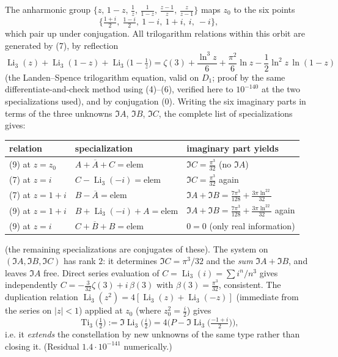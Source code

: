 \documentclass[11pt]{article}
\theoremstyle{remark}
\begin{document}
The anharmonic group $\{z,\,1-z,\,\tfrac1z,\,\tfrac1{1-z},\,\tfrac{z-1}z,\,\tfrac z{z-1}\}$ maps $z_0$ to the six points
\[
\Big\{\tfrac{1+i}2,\ \tfrac{1-i}2,\ 1-i,\ 1+i,\ i,\ -i\Big\},
\]
which pair up under conjugation. All trilogarithm relations within this orbit are generated by (7), by reflection
\begin{equation*}
\operatorname{Li}_3(z)+\operatorname{Li}_3(1-z)+\operatorname{Li}_3\!\big(1-\tfrac1z\big)=\zeta(3)+\frac{\ln^3z}{6}+\frac{\pi^2}{6}\ln z-\frac12\ln^2z\,\ln(1-z) \tag{9}
\end{equation*}
(the Landen--Spence trilogarithm equation, valid on $D_1$; proof by the same differentiate-and-check method using (4)--(6), verified here to $10^{-140}$ at the two specializations used), and by conjugation (0). Writing the six imaginary parts in terms of the three unknowns $\Im A$, $\Im B$, $\Im C$, the complete list of specializations gives:

\begin{center}
\begin{tabular}{lll}
\hline
relation & specialization & imaginary part yields \\
\hline
(9) at $z=z_0$ & $A+\overline A+C=\text{elem}$ & $\Im C=\tfrac{\pi^3}{32}$ (no $\Im A$) \\
(7) at $z=i$ & $C-\operatorname{Li}_3(-i)=\text{elem}$ & $\Im C=\tfrac{\pi^3}{32}$ again \\
(7) at $z=1+i$ & $B-\overline A=\text{elem}$ & $\Im A+\Im B=\tfrac{7\pi^3}{128}+\tfrac{3\pi\ln^22}{32}$ \\
(9) at $z=1+i$ & $B+\operatorname{Li}_3(-i)+A=\text{elem}$ & $\Im A+\Im B=\tfrac{7\pi^3}{128}+\tfrac{3\pi\ln^22}{32}$ again \\
(9) at $z=i$ & $C+\overline B+B=\text{elem}$ & $0=0$ (only real information) \\
\hline
\end{tabular}
\end{center}

(the remaining specializations are conjugates of these). The system on $(\Im A,\Im B,\Im C)$ has rank $2$: it determines $\Im C=\pi^3/32$ and the \emph{sum} $\Im A+\Im B$, and leaves $\Im A$ free. Direct series evaluation of $C=\operatorname{Li}_3(i)=\sum i^n/n^3$ gives independently $C=-\tfrac{3}{32}\zeta(3)+i\,\beta(3)$ with $\beta(3)=\tfrac{\pi^3}{32}$, consistent. The duplication relation $\operatorname{Li}_3(z^2)=4[\operatorname{Li}_3(z)+\operatorname{Li}_3(-z)]$ (immediate from the series on $|z|<1$) applied at $z_0$ (where $z_0^2=\tfrac i2$) gives
\[
\operatorname{Ti}_3\!\big(\tfrac12\big):=\Im\operatorname{Li}_3\!\big(\tfrac i2\big)=4\Big(P-\Im\operatorname{Li}_3\!\big(\tfrac{-1+i}2\big)\Big),
\]
i.e. it \emph{extends} the constellation by new unknowns of the same type rather than closing it. (Residual $1.4\cdot10^{-141}$ numerically.)
\end{document}
